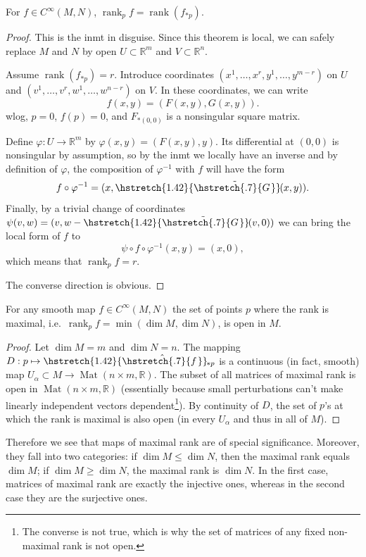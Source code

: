 \documentclass[english,letterpaper]{article}%
\numberwithin{equation}{section}
\numberwithin{figure}{section}
\numberwithin{table}{section}
\theoremstyle{definition}
\theoremstyle{definition}
\theoremstyle{definition}
\theoremstyle{plain}
\theoremstyle{plain}
\theoremstyle{plain}
\theoremstyle{plain}
\theoremstyle{remark}
\theoremstyle{remark}
\renewcommand{\geq}{\geqslant}
\renewcommand{\leq}{\leqslant}
\DeclareMathOperator{\Mat}{Mat}
\DeclareMathOperator{\rank}{rank}
\newcommand\wh[1]{\hstretch{1.42}{\hat{\hstretch{.7}{#1\mkern2mu}}}\mkern-2mu} %
\newcommand\wt[1]{\hstretch{1.42}{\tilde{\hstretch{.7}{#1\mkern2mu}}}\mkern-2mu}
\begin{document}
\begin{thm}\label{Rank thm}
For $f\in C^\infty(M,N)$, $\rank_p f=\rank (f_{\ast p})$.
\end{thm}
\begin{proof}
This is the \gls{inmt} in disguise. Since this theorem is local, we can safely replace $M$ and $N$ by open $U\subset \mathbb{R}^m$ and $V\subset \mathbb{R}^n.$

Assume $\rank(f_{\ast p})=r$. Introduce coordinates $(x^1,\ldots,x^r,y^1,\ldots,y^{m-r})$ on $U$ and $(v^1,\ldots,v^r,w^1,\ldots,w^{n-r})$ on $V$. In these coordinates, we can write \[f(x,y)=(F(x,y),G(x,y)).\] \Gls{wlog}, $p=0$, $f(p)=0$, and  $F_{\ast (0,0)}$ is a nonsingular square matrix.

Define $\varphi:U\to\mathbb{R}^m$ by $\varphi(x,y)=(F(x,y),y)$. Its differential at $(0,0)$ is nonsingular by assumption, so by the \gls{inmt} we locally have an inverse and by definition of $\varphi$, the composition of $\varphi^{-1}$ with $f$ will have the form 
\[
f\circ\varphi^{-1}=(x,\wt{G}(x,y)).
\]
Finally, by a trivial change of coordinates $\psi(v,w)=(v,w-\wt{G}(v,0))$ we can bring the local form of $f$ to \[\psi\circ f\circ \varphi^{-1}(x,y)=(x,0),\] which means that $\rank_p f=r$.

The converse direction is obvious.
\end{proof}

\begin{prop}\label{domain of maximal rank}
For any smooth map $f\in C^\infty (M,N)$ the set of points $p$ where the rank is maximal, i.e.\ $\rank_p f=\min(\dim M,\dim N)$, is open in $M$.
\end{prop}
\begin{proof}
Let $\dim M=m$ and $\dim N=n$. The mapping $D:p\mapsto \wh{f}_{\ast p}$ is a continuous (in fact, smooth) map $U_\alpha\subset M\to \Mat(n\times m,\mathbb{R})$. The subset of all matrices of maximal rank is open in $\Mat(n\times m,\mathbb{R})$ (essentially because small perturbations can't make linearly independent vectors dependent\footnote{The converse is not true, which is why the set of matrices of any fixed non-maximal rank is not open.}). By continuity of $D$, the set of $p$'s at which the rank is maximal is also open (in every $U_\alpha$ and thus in all of $M$).
\end{proof}

Therefore we see that maps of maximal rank are of special significance. Moreover, they fall into two categories: if $\dim M\leq \dim N$, then the maximal rank equals $\dim M$; if $\dim M\geq \dim N$, the maximal rank is $\dim N$. In the first case, matrices of maximal rank are exactly the injective ones, whereas in the second case they are the surjective ones.
\end{document}

